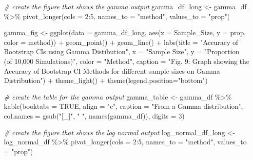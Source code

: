 \documentclass[12pt]{article}
\newenvironment{Shaded}{\begin{snugshade}}{\end{snugshade}}
\newcommand{\AttributeTok}[1]{\textcolor[rgb]{0.77,0.63,0.00}{#1}}
\newcommand{\CommentTok}[1]{\textcolor[rgb]{0.56,0.35,0.01}{\textit{#1}}}
\newcommand{\ConstantTok}[1]{\textcolor[rgb]{0.00,0.00,0.00}{#1}}
\newcommand{\DecValTok}[1]{\textcolor[rgb]{0.00,0.00,0.81}{#1}}
\newcommand{\FunctionTok}[1]{\textcolor[rgb]{0.00,0.00,0.00}{#1}}
\newcommand{\NormalTok}[1]{#1}
\newcommand{\OtherTok}[1]{\textcolor[rgb]{0.56,0.35,0.01}{#1}}
\newcommand{\SpecialCharTok}[1]{\textcolor[rgb]{0.00,0.00,0.00}{#1}}
\newcommand{\StringTok}[1]{\textcolor[rgb]{0.31,0.60,0.02}{#1}}
\begin{document}
\begin{Shaded}
\begin{Highlighting}[]
\CommentTok{\# create the figure that shows the gamma output}
\NormalTok{gamma\_df\_long }\OtherTok{\textless{}{-}}\NormalTok{ gamma\_df }\SpecialCharTok{\%\textgreater{}\%}
  \FunctionTok{pivot\_longer}\NormalTok{(}\AttributeTok{cols =} \DecValTok{2}\SpecialCharTok{:}\DecValTok{5}\NormalTok{, }\AttributeTok{names\_to =} \StringTok{"method"}\NormalTok{, }\AttributeTok{values\_to =} \StringTok{"prop"}\NormalTok{) }
    
\NormalTok{gamma\_fig }\OtherTok{\textless{}{-}} \FunctionTok{ggplot}\NormalTok{(}\AttributeTok{data =}\NormalTok{ gamma\_df\_long, }
                    \FunctionTok{aes}\NormalTok{(}\AttributeTok{x =}\NormalTok{ Sample\_Size, }\AttributeTok{y =}\NormalTok{ prop, }\AttributeTok{color =}\NormalTok{ method)) }\SpecialCharTok{+} 
  \FunctionTok{geom\_point}\NormalTok{() }\SpecialCharTok{+} \FunctionTok{geom\_line}\NormalTok{() }\SpecialCharTok{+} 
  \FunctionTok{labs}\NormalTok{(}\AttributeTok{title =} \StringTok{"Accuracy of Bootstrap CIs using Gamma Distibution"}\NormalTok{, }
       \AttributeTok{x =} \StringTok{"Sample Size"}\NormalTok{, }
       \AttributeTok{y =} \StringTok{"Proportion (of 10,000 Simulations)"}\NormalTok{, }\AttributeTok{color =} \StringTok{"Method"}\NormalTok{,}
       \AttributeTok{caption =} \StringTok{"Fig. 9: Graph showing the Accuracy of Bootstrap CI }
\StringTok{       Methods for different sample sizes on Gamma Distribution"}\NormalTok{) }\SpecialCharTok{+}
  \FunctionTok{theme\_light}\NormalTok{() }\SpecialCharTok{+}
  \FunctionTok{theme}\NormalTok{(}\AttributeTok{legend.position=}\StringTok{"bottom"}\NormalTok{)}

\CommentTok{\# create the table for the gamma output}
\NormalTok{gamma\_table }\OtherTok{\textless{}{-}}\NormalTok{ gamma\_df }\SpecialCharTok{\%\textgreater{}\%}
  \FunctionTok{kable}\NormalTok{(}\AttributeTok{booktabs =} \ConstantTok{TRUE}\NormalTok{, }\AttributeTok{align =} \StringTok{"c"}\NormalTok{, }
        \AttributeTok{caption =} \StringTok{"From a Gamma distribution"}\NormalTok{, }
        \AttributeTok{col.names =} \FunctionTok{gsub}\NormalTok{(}\StringTok{"[\_]"}\NormalTok{, }\StringTok{" "}\NormalTok{, }\FunctionTok{names}\NormalTok{(gamma\_df)), }\AttributeTok{digits =} \DecValTok{3}\NormalTok{) }
   
\CommentTok{\# create the figure that shows the log normal output}
\NormalTok{log\_normal\_df\_long }\OtherTok{\textless{}{-}}\NormalTok{ log\_normal\_df }\SpecialCharTok{\%\textgreater{}\%}
  \FunctionTok{pivot\_longer}\NormalTok{(}\AttributeTok{cols =} \DecValTok{2}\SpecialCharTok{:}\DecValTok{5}\NormalTok{, }\AttributeTok{names\_to =} \StringTok{"method"}\NormalTok{, }\AttributeTok{values\_to =} \StringTok{"prop"}\NormalTok{) }
    

\end{Highlighting}
\end{Shaded}
\end{document}
